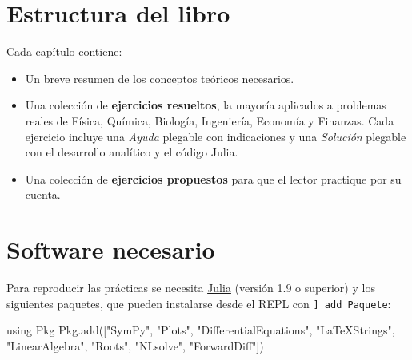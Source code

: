 \documentclass[
  spanish,
  a4paper,
]{scrreport}
\newenvironment{Shaded}{\begin{snugshade}}{\end{snugshade}}
\newcommand{\BuiltInTok}[1]{\textcolor[rgb]{0.00,0.23,0.31}{#1}}
\newcommand{\FunctionTok}[1]{\textcolor[rgb]{0.28,0.35,0.67}{#1}}
\newcommand{\ImportTok}[1]{\textcolor[rgb]{0.00,0.46,0.62}{#1}}
\newcommand{\NormalTok}[1]{\textcolor[rgb]{0.00,0.23,0.31}{#1}}
\newcommand{\StringTok}[1]{\textcolor[rgb]{0.13,0.47,0.30}{#1}}
\providecommand{\tightlist}{%
  \setlength{\itemsep}{0pt}\setlength{\parskip}{0pt}}
\theoremstyle{definition}
\theoremstyle{remark}
\begin{document}
\section*{Estructura del libro}\label{estructura-del-libro}


Cada capítulo contiene:

\begin{itemize}
\tightlist
\item
  Un breve resumen de los conceptos teóricos necesarios.
\item
  Una colección de \textbf{ejercicios resueltos}, la mayoría aplicados a
  problemas reales de Física, Química, Biología, Ingeniería, Economía y
  Finanzas. Cada ejercicio incluye una \emph{Ayuda} plegable con
  indicaciones y una \emph{Solución} plegable con el desarrollo
  analítico y el código Julia.
\item
  Una colección de \textbf{ejercicios propuestos} para que el lector
  practique por su cuenta.
\end{itemize}

\section*{Software necesario}\label{software-necesario}


Para reproducir las prácticas se necesita
\href{https://julialang.org/downloads/}{Julia} (versión 1.9 o superior)
y los siguientes paquetes, que pueden instalarse desde el REPL con
\texttt{{]}\ add\ Paquete}:

\begin{Shaded}
\begin{Highlighting}[]
\ImportTok{using} \BuiltInTok{Pkg}
\BuiltInTok{Pkg}\NormalTok{.}\FunctionTok{add}\NormalTok{([}\StringTok{"SymPy"}\NormalTok{, }\StringTok{"Plots"}\NormalTok{, }\StringTok{"DifferentialEquations"}\NormalTok{, }\StringTok{"LaTeXStrings"}\NormalTok{,}
         \StringTok{"LinearAlgebra"}\NormalTok{, }\StringTok{"Roots"}\NormalTok{, }\StringTok{"NLsolve"}\NormalTok{, }\StringTok{"ForwardDiff"}\NormalTok{])}
\end{Highlighting}
\end{Shaded}
\end{document}
